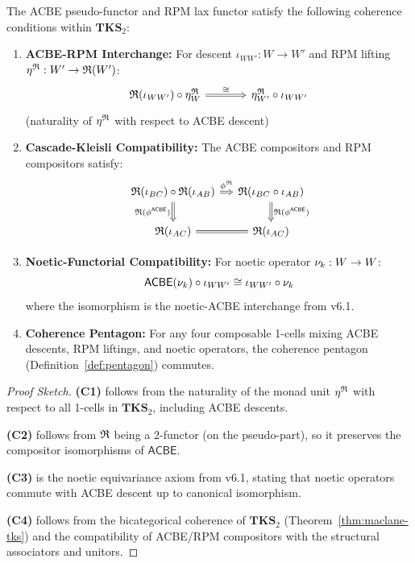 \begin{proposition}
\label{prop:acbe-rpm-coherence}
The ACBE pseudo-functor and RPM lax functor satisfy the following coherence
conditions within $\mathbf{TKS}_2$:

\begin{enumerate}[label=\textbf{(C\arabic*)}]
  \item \textbf{ACBE-RPM Interchange:} For descent $\iota_{WW'} : W \to W'$ and
        RPM lifting $\eta^{\mathfrak{R}} : W' \to \mathfrak{R}(W')$:
        \[
        \begin{tikzcd}[column sep=large]
          \RPM(\iota_{WW'}) \circ \eta^\RPM_W
            \arrow[r, Rightarrow, "\cong"]
          &
          \eta^\RPM_{W'} \circ \iota_{WW'}
        \end{tikzcd}
        \]
        (naturality of $\eta^{\mathfrak{R}}$ with respect to ACBE descent)

  \item \textbf{Cascade-Kleisli Compatibility:} The ACBE compositors and RPM
        compositors satisfy:
        \[
        \begin{tikzcd}[column sep=small]
          \RPM(\iota_{BC}) \circ \RPM(\iota_{AB})
            \arrow[r, Rightarrow, "\phi^\RPM"]
            \arrow[d, Rightarrow, "\RPM(\phi^{\mathsf{ACBE}})"']
          &
          \RPM(\iota_{BC} \circ \iota_{AB})
            \arrow[d, Rightarrow, "\RPM(\phi^{\mathsf{ACBE}})"]
          \\
          \RPM(\iota_{AC})
            \arrow[r, equal]
          &
          \RPM(\iota_{AC})
        \end{tikzcd}
        \]

  \item \textbf{Noetic-Functorial Compatibility:} For noetic operator $\nu_{k} : W \to W$:
        \[
          \mathsf{ACBE}(\nu_{k}) \circ \iota_{WW'} \cong \iota_{WW'} \circ \nu_{k}
        \]
        where the isomorphism is the noetic-ACBE interchange from v6.1.

  \item \textbf{Coherence Pentagon:} For any four composable 1-cells mixing
        ACBE descents, RPM liftings, and noetic operators, the coherence
        pentagon (Definition~\ref{def:pentagon}) commutes.
\end{enumerate}
\end{proposition}

\begin{proof}[Proof Sketch]
\textbf{(C1)} follows from the naturality of the monad unit $\eta^{\mathfrak{R}}$ with
respect to all 1-cells in $\mathbf{TKS}_2$, including ACBE descents.

\textbf{(C2)} follows from $\mathfrak{R}$ being a 2-functor (on the pseudo-part), so it
preserves the compositor isomorphisms of $\mathsf{ACBE}$.

\textbf{(C3)} is the noetic equivariance axiom from v6.1, stating that noetic
operators commute with ACBE descent up to canonical isomorphism.

\textbf{(C4)} follows from the bicategorical coherence of $\mathbf{TKS}_2$
(Theorem~\ref{thm:maclane-tks}) and the compatibility of ACBE/RPM compositors
with the structural associators and unitors.
\end{proof}

